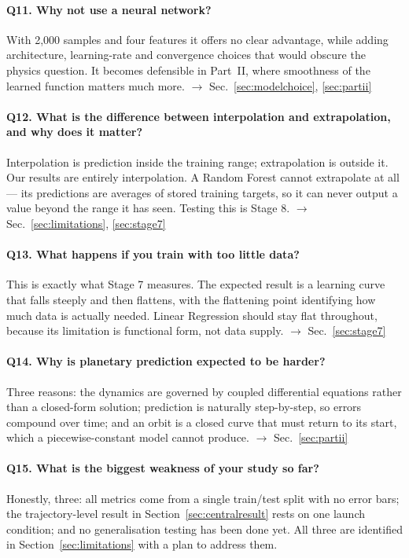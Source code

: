 \documentclass[11pt,a4paper]{article}
\begin{document}
\paragraph{Q11. Why not use a neural network?}
With 2{,}000 samples and four features it offers no clear advantage, while adding architecture,
learning-rate and convergence choices that would obscure the physics question. It becomes defensible
in Part~II, where smoothness of the learned function matters much more.
$\rightarrow$ Sec.~\ref{sec:modelchoice}, \ref{sec:partii}

\paragraph{Q12. What is the difference between interpolation and extrapolation, and why does it matter?}
Interpolation is prediction inside the training range; extrapolation is outside it. Our results are
entirely interpolation. A Random Forest cannot extrapolate at all --- its predictions are averages of
stored training targets, so it can never output a value beyond the range it has seen. Testing this is
Stage 8. $\rightarrow$ Sec.~\ref{sec:limitations}, \ref{sec:stage7}

\paragraph{Q13. What happens if you train with too little data?}
This is exactly what Stage 7 measures. The expected result is a learning curve that falls steeply and
then flattens, with the flattening point identifying how much data is actually needed. Linear
Regression should stay flat throughout, because its limitation is functional form, not data supply.
$\rightarrow$ Sec.~\ref{sec:stage7}

\paragraph{Q14. Why is planetary prediction expected to be harder?}
Three reasons: the dynamics are governed by coupled differential equations rather than a closed-form
solution; prediction is naturally step-by-step, so errors compound over time; and an orbit is a
closed curve that must return to its start, which a piecewise-constant model cannot produce.
$\rightarrow$ Sec.~\ref{sec:partii}

\paragraph{Q15. What is the biggest weakness of your study so far?}
Honestly, three: all metrics come from a single train/test split with no error bars; the
trajectory-level result in Section~\ref{sec:centralresult} rests on one launch condition; and no
generalisation testing has been done yet. All three are identified in
Section~\ref{sec:limitations} with a plan to address them.
\end{document}
